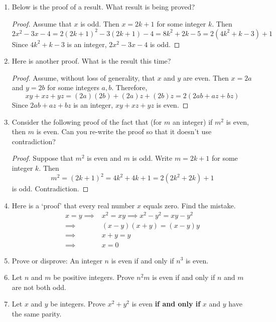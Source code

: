 \begin{exercises}{}{}
\begin{enumerate}
	  
	  
		\item Below is the proof of a result. What result is being proved?
	  \begin{proof}
	  	Assume that $x$ is odd. Then $x=2k+1$ for some integer $k$. Then
	  	\[
	  		2x^2-3x-4=2(2k+1)^2-3(2k+1)-4=8k^2+2k-5=2(4k^2+k-3)+1
	  	\]
	  	Since $4k^2+k-3$ is an integer, $2x^2-3x-4$ is odd.
	  \end{proof}
 
	
		\item Here is another proof. What is the result this time?
	  \begin{proof}
	  	Assume, without loss of generality, that $x$ and $y$ are even. Then $x=2a$ and $y=2b$ for some integers $a,b$. Therefore,
	  	\[
	  		xy+xz+yz=(2a)(2b)+(2a)z+(2b)z=2(2ab+az+bz)
	  	\]
	  	Since $2ab+az+bz$ is an integer, $xy+xz+yz$ is even.
	  \end{proof}
	
	
    \item Consider the following proof of the fact that (for $m$ an integer) if $m^2$ is even, then $m$ is even. Can you re-write the proof so that it doesn't use contradiction?
    \begin{proof}
    	Suppose that $m^2$ is even and $m$ is odd. Write $m=2k+1$ for some integer $k$. Then
			\[
				m^2=(2k+1)^2 =4k^2+4k+1 =2(2k^2+2k) + 1
			\]
      is odd. Contradiction.
    \end{proof}	 
    
    
    \item Here is a `proof' that every real number $x$ equals zero. Find the mistake.
		\begin{align*}
			x=y\implies &x^2=xy \implies x^2-y^2=xy-y^2\\
			\implies &(x-y)(x+y)=(x-y)y\\
			\implies &x+y=y\\
			\implies &x=0
		\end{align*}
		
		
		\item Prove or disprove: An integer $n$ is even if and only if $n^3$ is even. 
    
   
		\item Let $n$ and $m$ be positive integers. Prove $n^2m$ is even if and only if $n$ and $m$ are not both odd.
		
		
    \item Let $x$ and $y$ be integers. Prove $x^2+y^2$ is even  \textbf{if and only if} $x$ and $y$ have the same parity.
    

\end{enumerate}
\end{exercises}
